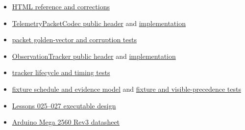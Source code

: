 \documentclass[11pt]{article}
\begin{document}
\begin{itemize}
  \item
    \href{https://spincyc.github.io/adk/lessons/026.html}
         {HTML reference and corrections}
  \item
    \href{https://github.com/spincyc/adk/blob/main/src/telemetry_packet.h}
         {TelemetryPacketCodec public header} and
    \href{https://github.com/spincyc/adk/blob/main/src/telemetry_packet.cpp}
         {implementation}
  \item
    \href{https://github.com/spincyc/adk/blob/main/tests/test_telemetry_packet.cpp}
         {packet golden-vector and corruption tests}
  \item
    \href{https://github.com/spincyc/adk/blob/main/src/observation_tracker.h}
         {ObservationTracker public header} and
    \href{https://github.com/spincyc/adk/blob/main/src/observation_tracker.cpp}
         {implementation}
  \item
    \href{https://github.com/spincyc/adk/blob/main/tests/test_observation_tracker.cpp}
         {tracker lifecycle and timing tests}
  \item
    \href{https://github.com/spincyc/adk/blob/main/src/telemetry_evidence.h}
         {fixture schedule and evidence model} and
    \href{https://github.com/spincyc/adk/blob/main/tests/test_telemetry_evidence.cpp}
         {fixture and visible-precedence tests}
  \item
    \href{https://github.com/spincyc/adk/blob/main/docs/design/LESSONS_025_027_TELEMETRY.md}
         {Lessons 025--027 executable design}
  \item
    \href{https://docs.arduino.cc/resources/datasheets/A000067-datasheet.pdf}
         {Arduino Mega 2560 Rev3 datasheet}
\end{itemize}
\end{document}
